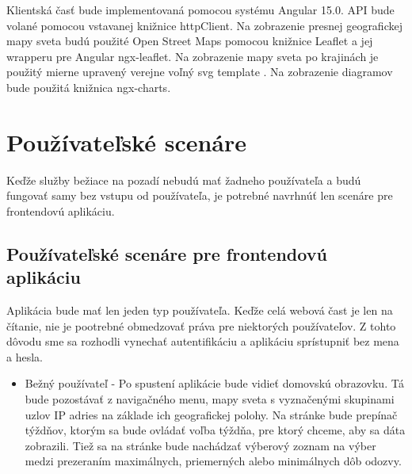 Klientská časť bude implementovaná pomocou systému Angular 15.0. API bude volané pomocou vstavanej knižnice httpClient. Na zobrazenie 
presnej geografickej mapy sveta budú použité Open Street Maps pomocou knižnice Leaflet a jej wrapperu pre Angular ngx-leaflet. Na zobrazenie 
mapy sveta po krajinách je použitý mierne upravený verejne voľný svg template \cite{svg_mapa}. Na zobrazenie diagramov bude použitá knižnica ngx-charts. 

\section{Používateľské scenáre}
Keďže služby bežiace na pozadí nebudú mať žadneho používateľa a budú fungovať samy bez vstupu od používateľa, je potrebné navrhnúť len scenáre 
pre frontendovú aplikáciu.

\subsection{Používateľské scenáre pre frontendovú aplikáciu}
Aplikácia bude mať len jeden typ používateľa. Keďže celá webová čast je len na čítanie, nie je pootrebné obmedzovať práva pre niektorých používateľov. 
Z tohto dôvodu sme sa rozhodli vynechať autentifikáciu a aplikáciu sprístupniť bez mena a hesla.

\begin{itemize}
    \item Bežný používateľ - Po spustení aplikácie bude vidieť domovskú obrazovku. Tá bude pozostávať z navigačného menu, mapy sveta s vyznačenými skupinami 
    uzlov IP adries na základe ich geografickej polohy. Na stránke bude prepínač týždňov, ktorým sa bude ovládať voľba týždňa, pre ktorý chceme, aby sa 
    dáta zobrazili. Tiež sa na stránke bude nachádzať výberový zoznam na výber medzi prezeraním maximálnych, priemerných alebo minimálnych dôb odozvy.
\end{itemize}